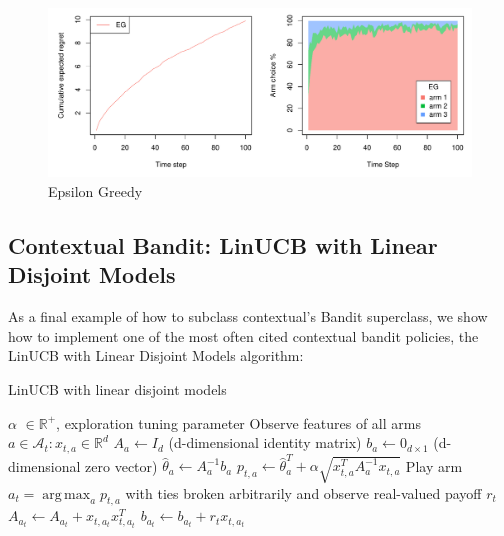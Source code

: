 \documentclass[nojss]{jss}\usepackage[]{graphicx}\usepackage[]{color}
\makeatletter
\def\maxwidth{ %
  \ifdim\Gin@nat@width>\linewidth
    \linewidth
  \else
    \Gin@nat@width
  \fi
}
\newenvironment{knitrout}{}{} %
\DeclareMathOperator*{\argmax}{arg\,max}
\makeatother
\begin{document}
\begin{center}
\begin{knitrout}
\color{fgcolor}\begin{figure}[H]
\includegraphics[width=\maxwidth,]{fig/fig2-1} \caption[Epsilon Greedy]{Epsilon Greedy}\label{fig:fig2}
\end{figure}


\end{knitrout}
\end{center}

\subsection{Contextual Bandit: LinUCB with Linear Disjoint Models}

As a final example of how to subclass contextual's Bandit superclass, we show how to implement one of the most often cited contextual bandit policies, the LinUCB with Linear Disjoint Models algorithm:

\begin{algorithm}[H]
\caption{LinUCB with linear disjoint models}
\label{Alg:LinUCBDisjoint}
\begin{algorithmic}
\REQUIRE $\alpha$ \(  \in \mathbb{R}^{+} \), exploration tuning parameter
          \STATE Observe features of all arms \(  a \in \mathcal{A}_{t}: x_{t,a} \in \mathbb{R}^{d}\)
		      \STATE \(A_{a} \leftarrow I_{d}  \)  (d-dimensional identity matrix)
		      \STATE \(b_{a} \leftarrow 0_{d\times1}   \) (d-dimensional zero vector)
		\ENDIF
		\STATE \( \hat{\theta}_{a} \leftarrow A_{a}^{-1}b_{a} \)
		\STATE \( p_{t,a} \leftarrow \hat{\theta}_{a}^{T} + \alpha  \sqrt{ x_{t,a}^{T} A_{a}^{-1}x_{t,a}} \)
	\ENDFOR
	\STATE Play arm \(a_t = \argmax_a  p_{t,a}  \) with ties broken arbitrarily and observe real-valued payoff $r_t$
           \STATE \( A_{a_{t}} \leftarrow A_{a_{t}}+ x_{t,a_{t}}x_{t,a_{t}}^{T} \)
           \STATE  \( b_{a_{t}} \leftarrow b_{a_{t}}+ r_{t}x_{t,a_{t}}  \)
\ENDFOR
\end{algorithmic}
\end{algorithm}
\end{document}
